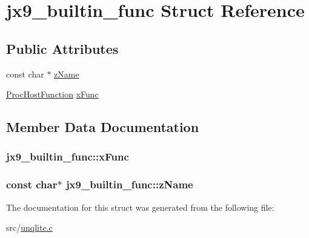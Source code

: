 \hypertarget{structjx9__builtin__func}{\section{jx9\-\_\-builtin\-\_\-func Struct Reference}
\label{d1/d03/structjx9__builtin__func}
}
\subsection*{Public Attributes}
\begin{DoxyCompactItemize}
\item 
const char $\ast$ \hyperlink{structjx9__builtin__func_a306f257b06709e3de21ba8714d76fef4}{z\-Name}
\item 
\hyperlink{unqlite_8c_a6bc67af6d701fce5bf74262b4ee4da2d}{Proc\-Host\-Function} \hyperlink{structjx9__builtin__func_ac72517159f8471c65232f611cc7e80ee}{x\-Func}
\end{DoxyCompactItemize}


\subsection{Member Data Documentation}
\hypertarget{structjx9__builtin__func_ac72517159f8471c65232f611cc7e80ee}{
\subsubsection[{x\-Func}]{ jx9\-\_\-builtin\-\_\-func\-::x\-Func}}\label{d1/d03/structjx9__builtin__func_ac72517159f8471c65232f611cc7e80ee}
\hypertarget{structjx9__builtin__func_a306f257b06709e3de21ba8714d76fef4}{
\subsubsection[{z\-Name}]{\setlength{\rightskip}{0pt plus 5cm}const char$\ast$ jx9\-\_\-builtin\-\_\-func\-::z\-Name}}\label{d1/d03/structjx9__builtin__func_a306f257b06709e3de21ba8714d76fef4}


The documentation for this struct was generated from the following file\-:\begin{DoxyCompactItemize}
\item 
src/\hyperlink{unqlite_8c}{unqlite.\-c}\end{DoxyCompactItemize}

